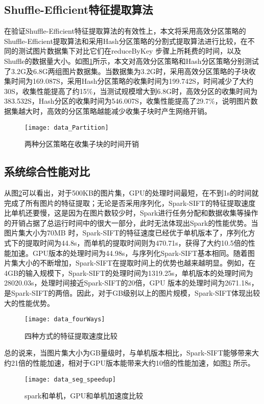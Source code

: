 \subsection{Shuffle-Efficient特征提取算法}
在验证Shuffle-Efficient特征提取算法的有效性上，本文将采用高效分区策略的Shuffle-Efficient提取算法和采用Hash分区策略的分割式提取算法进行比较，在不同的测试图片数据集下对比它们在reduceByKey 步骤上所耗费的时间，以及Shuffle的数据量大小。如图\ref{fig:data_Partition}所示，本文对高效分区策略和Hash分区策略分别测试了3.2G及6.8G两组图片数据集。当数据集为3.2G时，采用高效分区策略的子块收集时间为169.087S，采用Hash分区策略的收集时间为199.742S，时间减少了大约30S，收集性能提高了约15\%，当测试规模增大到6.8G时，高效分区的收集时间为383.532S，Hash分区的收集时间为546.007S，收集性能提高了29.7\%，说明图片数据集越大时，高效的分区策略越能减少收集子块时产生网络开销。
\begin{figure}[htp]
\centering
\texttt{[image: data\_Partition]}
\caption{两种分区策略在收集子块的时间开销}
\label{fig:data_Partition}
\end{figure}

\subsection{系统综合性能对比}
从图\ref{fig:data_fourWays}可以看出，对于500KB的图片集，GPU的处理时间最短，在不到1s的时间就完成了所有图片的特征提取；无论是否采用序列化，Spark-SIFT的特征提取速度比单机还要慢，这是因为在图片数较少时，Spark进行任务分配和数据收集等操作的开销占据了总运行时间中的很大一部分，此时无法体现出Spark的性能优势。当图片集大小为70MB 时，Spark-SIFT的特征速度已经优于单机版本了，序列化方式下的提取时间为44.8s，而单机的提取时间则为470.71s，获得了大约10.5倍的性能加速。GPU版本的处理时间为44.98s，与序列化Spark-SIFT基本相同。随着图片集大小的不断增加，Spark-SIFT在提取时间上的优势也越来越明显。例如，在4GB的输入规模下，Spark-SIFT的处理时间为1319.25s，单机版本的处理时间为28020.03s，处理时间接近Spark-SIFT的20倍，GPU 版本的处理时间为2671.18s，是Spark-SIFT的两倍。因此，对于GB级别以上的图片规模，Spark-SIFT体现出较大的性能优势。
\begin{figure}[htp]
\centering
\texttt{[image: data\_fourWays]}
\caption{四种方式的特征提取速度比较}
\label{fig:data_fourWays}
\end{figure}

总的说来，当图片集大小为GB量级时，与单机版本相比，Spark-SIFT能够带来大约21倍的性能加速，相对于GPU版本能带来大约10倍的性能加速，如图\ref{fig:data_seg_speedup} 所示。
\begin{figure}[htp]
\centering
\texttt{[image: data\_seg\_speedup]}
\caption{spark和单机，GPU和单机加速度比较}
\label{fig:data_seg_speedup}
\end{figure}

